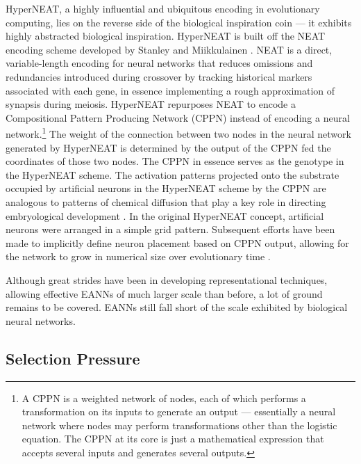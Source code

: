 HyperNEAT, a highly influential and ubiquitous encoding in evolutionary computing, lies on the reverse side of the biological inspiration coin --- it exhibits highly abstracted biological inspiration.
HyperNEAT is built off the NEAT encoding scheme developed by Stanley and Miikkulainen \cite[p 324]{Downing2015IntelligenceSystems}.
NEAT is a direct, variable-length encoding for neural networks that reduces omissions and redundancies introduced during crossover by tracking historical markers associated with each gene, in essence implementing a rough approximation of synapsis during meiosis.
HyperNEAT repurposes NEAT to encode a Compositional Pattern Producing Network (CPPN) instead of encoding a neural network.\footnote{
A CPPN is a weighted network of nodes, each of which performs a transformation on its inputs to generate an output --- essentially a neural network where nodes may perform transformations other than the logistic equation. The CPPN at its core is just a mathematical expression that accepts several inputs and generates several outputs.}
The weight of the connection between two nodes in the neural network generated by HyperNEAT is determined by the output of the CPPN fed the coordinates of those two nodes.
The CPPN in essence serves as the genotype in the HyperNEAT scheme.
The activation patterns projected onto the substrate occupied by artificial neurons in the HyperNEAT scheme by the CPPN are analogous to patterns of chemical diffusion that play a key role in directing embryological development \cite[p 339]{Downing2015IntelligenceSystems}.
In the original HyperNEAT concept, artificial neurons were arranged in a simple grid pattern.
Subsequent efforts have been made to implicitly define neuron placement based on CPPN output, allowing for the network to grow in numerical size over evolutionary time \cite{Risi2010EvolvingSubstrate,Risi2010IndirectlyRules'}.

Although great strides have been in developing representational techniques, allowing effective EANNs of much larger scale than before, a lot of ground remains to be covered.
EANNs still fall short of the scale exhibited by biological neural networks.

\subsection{Selection Pressure} \label{sec:selection}

